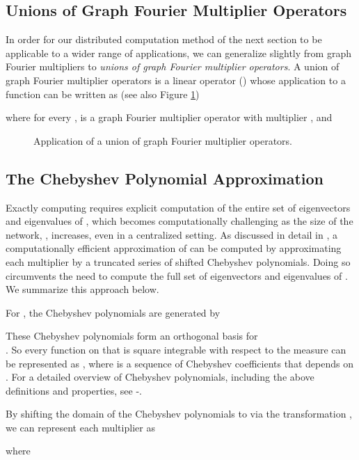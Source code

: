 \documentclass[conference]{IEEEtran}
\begin{document}
\subsection{Unions of Graph Fourier Multiplier Operators}
In order for our distributed computation method of the next section to be applicable to a wider range of applications, we can generalize slightly from graph Fourier multipliers to
\emph{unions of graph Fourier multiplier operators}. A union of graph Fourier multiplier operators is a linear operator
 () whose application to a function
 can be written as (see also Figure \ref{Fig:union})

where for every ,  is a graph Fourier multiplier operator with multiplier , and

\begin{figure}
\caption{Application of a union of graph Fourier multiplier operators.} \label{Fig:union}
\end{figure}


\subsection{The Chebyshev Polynomial Approximation}
Exactly computing  requires explicit computation of the entire set of eigenvectors and eigenvalues of , which becomes computationally challenging as the size of the network, , increases, even in a centralized setting. As discussed in detail in \cite[Section 6]{LTS-ARTICLE-2009-053}, a computationally efficient approximation  of  can be computed by approximating each multiplier  by a truncated series of shifted Chebyshev polynomials. Doing so circumvents the need to compute the full set of eigenvectors and eigenvalues of . We summarize this approach below.

For , the Chebyshev polynomials  are generated by

These Chebyshev polynomials form an orthogonal basis for \\
. So every function  on  that is square integrable with respect to the measure  can be represented as
,
where  is a sequence of Chebyshev coefficients that depends on .
For a detailed overview of Chebyshev polynomials, including the above definitions and properties,
see \cite{handscomb}-\nocite{phillips}\cite{rivlin}.

By shifting the domain of the Chebyshev polynomials to  via the transformation , we can represent each multiplier as

where
\end{document}
